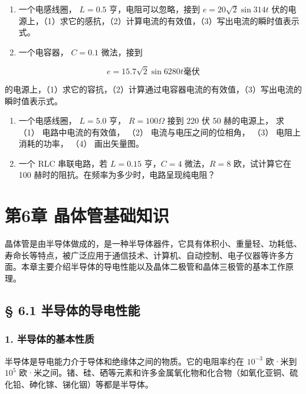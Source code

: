 \begin{enumerate}
\def\labelenumi{\arabic{enumi}.}
\item
  一个电感线圈， \(L=0.5\) 亨，电阻可以忽略，接到
  \(e=20\sqrt{2}\sin314t\)
  伏的电源上，（1）求它的感抗，（2）计算电流的有效值，（3）写出电流的瞬时值表示式。
\item
  一个电容器， \(C = 0.1\) 微法，接到
\end{enumerate}

\[
e = 15.7 \sqrt{2} \sin 6280 t \text{毫伏}
\]

的电源上，（1）求它的容抗，（2）计算通过电容器电流的有效值，（3）写出电流的瞬时值表示式。

\begin{enumerate}
\def\labelenumi{\arabic{enumi}.}
\setcounter{enumi}{2}
\item
  一个电感线圈， \(L = 5.0\) 亨， \(R = 100\Omega\) 接到 220 伏 50
  赫的电源上， 求 （1） 电路中电流的有效值， （2）
  电流与电压之间的位相角， （3） 电阻上消耗的功率， （4） 画出矢量图。
\item
  一个 RLC 串联电路，若 \(L = 0.15\) 亨，\(C = 4\) 微法，\(R = 8\)
  欧，试计算它在 100 赫时的阻抗。在频率为多少时，电路呈现纯电阻？
\end{enumerate}

\chapter{第6章
晶体管基础知识}\label{ux7b2c6ux7ae0-ux6676ux4f53ux7ba1ux57faux7840ux77e5ux8bc6}

晶体管是由半导体做成的，是一种半导体器件，它具有体积小、重量轻、功耗低、寿命长等特点，被广泛应用于通信技术、计算机、自动控制、电子仪器等许多方面。本章主要介绍半导体的导电性能以及晶体二极管和晶体三极管的基本工作原理。

\section{§ 6.1
半导体的导电性能}\label{ux534aux5bfcux4f53ux7684ux5bfcux7535ux6027ux80fd}

\subsection{1.
半导体的基本性质}\label{ux534aux5bfcux4f53ux7684ux57faux672cux6027ux8d28}

半导体是导电能力介于导体和绝缘体之间的物质。它的电阻率约在 \(10^{-3}\)
欧·米到 \(10^{5}\)
欧·米之间。锗、硅、硒等元素和许多金属氧化物和化合物（如氧化亚铜、硫化铅、砷化镓、锑化铟）等都是半导体。

